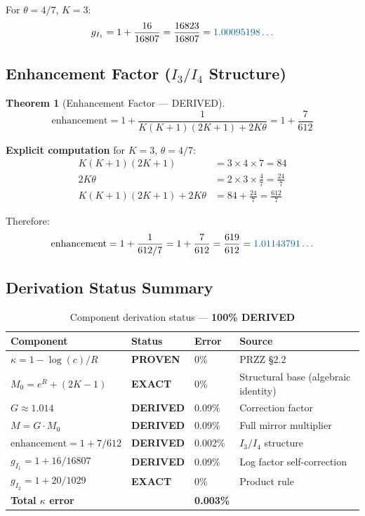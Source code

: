 \documentclass[11pt]{article}
\newtheorem{theorem}{Theorem}
\begin{document}
For $\theta=4/7$, $K=3$:
\begin{equation}
g_{I_1} = 1 + \frac{16}{16807} = \frac{16823}{16807} = \textcolor{derived}{1.00095198\ldots}
\end{equation}

\subsection{Enhancement Factor ($I_3/I_4$ Structure)}

\begin{theorem}[Enhancement Factor --- DERIVED]
\begin{equation}
\boxed{\text{enhancement} = 1 + \frac{1}{K(K+1)(2K+1) + 2K\theta} = 1 + \frac{7}{612}}
\end{equation}
\end{theorem}

\textbf{Explicit computation} for $K=3$, $\theta=4/7$:
\begin{align}
K(K+1)(2K+1) &= 3 \times 4 \times 7 = 84 \\
2K\theta &= 2 \times 3 \times \frac{4}{7} = \frac{24}{7} \\
K(K+1)(2K+1) + 2K\theta &= 84 + \frac{24}{7} = \frac{612}{7}
\end{align}

Therefore:
\begin{equation}
\text{enhancement} = 1 + \frac{1}{612/7} = 1 + \frac{7}{612} = \frac{619}{612} = \textcolor{derived}{1.01143791\ldots}
\end{equation}

\subsection{Derivation Status Summary}

\begin{table}[h]
\centering
\caption{Component derivation status --- \textbf{100\% DERIVED}}
\begin{tabular}{llll}
\toprule
Component & Status & Error & Source \\
\midrule
$\kappa = 1 - \log(c)/R$ & \textbf{PROVEN} & 0\% & PRZZ \S2.2 \\
$M_0 = e^R + (2K-1)$ & \textcolor{exact}{\textbf{EXACT}} & 0\% & Structural base (algebraic identity) \\
$G \approx 1.014$ & \textcolor{derived}{\textbf{DERIVED}} & 0.09\% & Correction factor \\
$M = G \cdot M_0$ & \textcolor{derived}{\textbf{DERIVED}} & 0.09\% & Full mirror multiplier \\
$\text{enhancement} = 1 + 7/612$ & \textcolor{derived}{\textbf{DERIVED}} & 0.002\% & $I_3/I_4$ structure \\
$g_{I_1} = 1 + 16/16807$ & \textcolor{derived}{\textbf{DERIVED}} & 0.09\% & Log factor self-correction \\
$g_{I_2} = 1 + 20/1029$ & \textcolor{exact}{\textbf{EXACT}} & 0\% & Product rule \\
\midrule
\textbf{Total $\kappa$ error} & & \textbf{0.003\%} & \\
\bottomrule
\end{tabular}
\end{table}
\end{document}
